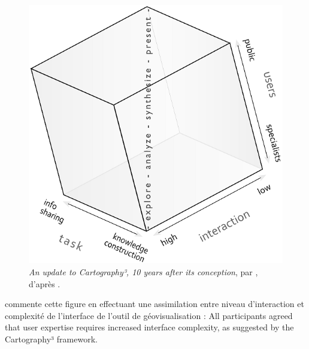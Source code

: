 
\begin{figure}[H]
	\centering
	\vspace{0pt}
	\includegraphics[width=.7\linewidth]{img/cartography3.png}
	\captionsetup{width=.7\linewidth}
	\caption{\og \textit{An update to Cartography³, 10 years after its conception}\fg{}, par \cite{coltekin_geovisualization_2018}, d'après \cite[10]{maceachren_geovisualization_2004}.}
	\label{fig:cartography3}
\end{figure}

\textcite[16]{roth_interactivity_2015} commente cette figure en effectuant une assimilation entre niveau d'interaction et complexité de l'interface de l'outil de géovisualisation : \og All participants agreed that user expertise requires increased interface complexity, as suggested by the Cartography³ framework\fg{}.

